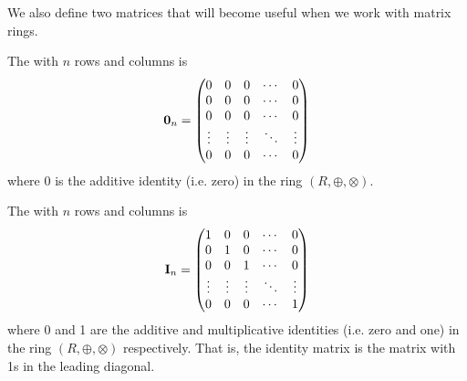 We also define two matrices that will become useful when we work with matrix rings.
\begin{definition}
    The  with $n$ rows and columns is
    \[
        \textbf{0}_{n} =
        \begin{pmatrix}
            0 & 0 & 0 & \cdots & 0 \\
            0 & 0 & 0 & \cdots & 0 \\
            0 & 0 & 0 & \cdots & 0 \\
            \vdots & \vdots & \vdots & \ddots & \vdots \\
            0 & 0 & 0 & \cdots & 0 \\
        \end{pmatrix}
    \]
    where 0 is the additive identity (i.e. zero) in the ring $(R, \oplus, \otimes)$.
\end{definition}
\begin{definition}
    The  with $n$ rows and columns is
    \[
        \textbf{I}_{n} =
        \begin{pmatrix}
            1 & 0 & 0 & \cdots & 0 \\
            0 & 1 & 0 & \cdots & 0 \\
            0 & 0 & 1 & \cdots & 0 \\
            \vdots & \vdots & \vdots & \ddots & \vdots \\
            0 & 0 & 0 & \cdots & 1 \\
        \end{pmatrix}
    \]
    where 0 and 1 are the additive and multiplicative identities (i.e. zero and one) in the ring $(R, \oplus, \otimes)$ respectively. That is, the identity matrix is the matrix with 1s in the leading diagonal.
\end{definition}

